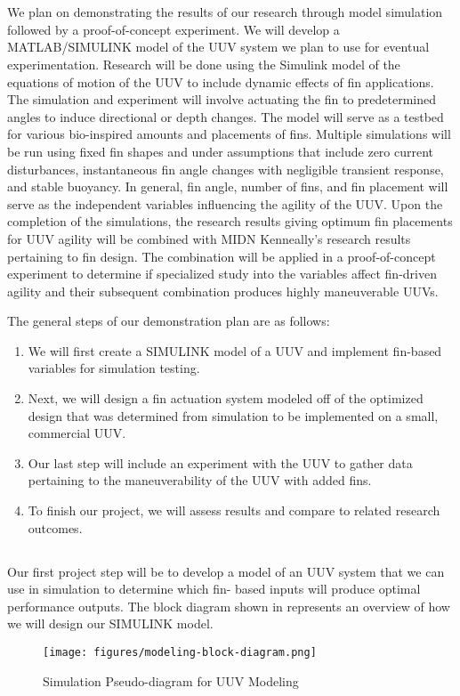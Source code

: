 \documentclass{IEEEtran}
\begin{document}
\section{}
We plan on demonstrating the results of our research through model simulation followed by a proof-of-concept experiment. We will develop a MATLAB/SIMULINK model of the UUV system we plan to use for eventual experimentation. Research will be done using the Simulink model of the equations of motion of the UUV to include dynamic effects of fin applications. The simulation and experiment will involve actuating the fin to predetermined angles to induce directional or depth changes. The model will serve as a testbed for various bio-inspired amounts and placements of fins. Multiple simulations will be run using fixed fin shapes and under assumptions that include zero current disturbances, instantaneous fin angle changes with negligible transient response, and stable buoyancy. In general, fin angle, number of fins, and fin placement will serve as the independent variables influencing the agility of the UUV. Upon the completion of the simulations, the research results giving optimum fin placements for UUV agility will be combined with MIDN Kenneally’s research results pertaining to fin design. The combination will be applied in a proof-of-concept experiment to determine if specialized study into the variables affect fin-driven agility and their subsequent combination produces highly maneuverable UUVs.

The general steps of our demonstration plan are as follows:
\begin{enumerate}
\item We will first create a SIMULINK model of a UUV and implement fin-based variables for simulation testing.
\item Next, we will design a fin actuation system modeled off of the optimized design that was determined from
simulation to be implemented on a small, commercial UUV.
\item Our last step will include an experiment with the UUV to gather data pertaining to the maneuverability of the
UUV with added fins.
\item To finish our project, we will assess results and compare to related research outcomes.
\end{enumerate}

\subsection{}
Our first project step will be to develop a model of an UUV system that we can use in simulation to determine which fin- based inputs will produce optimal performance outputs. The block diagram shown in  represents an overview of how we will design our SIMULINK model.
\begin{figure*}
\begin{center}
\texttt{[image: figures/modeling-block-diagram.png]}
\end{center}
\caption{Simulation Pseudo-diagram for UUV Modeling}
\label{fig:4}
\end{figure*}
\end{document}
